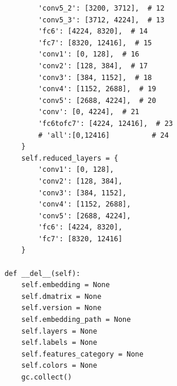 \documentclass[12,twoside]{TFG-GM}
\theoremstyle{definition}
\theoremstyle{remark}
\begin{document}
\begin{verbatim}
            'conv5_2': [3200, 3712],  # 12
            'conv5_3': [3712, 4224],  # 13
            'fc6': [4224, 8320],  # 14
            'fc7': [8320, 12416],  # 15
            'conv1': [0, 128],  # 16
            'conv2': [128, 384],  # 17
            'conv3': [384, 1152],  # 18
            'conv4': [1152, 2688],  # 19
            'conv5': [2688, 4224],  # 20
            'conv': [0, 4224],  # 21
            'fc6tofc7': [4224, 12416],  # 23
            # 'all':[0,12416]          # 24
        }
        self.reduced_layers = {
            'conv1': [0, 128],
            'conv2': [128, 384],
            'conv3': [384, 1152],
            'conv4': [1152, 2688],
            'conv5': [2688, 4224],
            'fc6': [4224, 8320],
            'fc7': [8320, 12416]
        }

    def __del__(self):
        self.embedding = None
        self.dmatrix = None
        self.version = None
        self.embedding_path = None
        self.layers = None
        self.labels = None
        self.features_category = None
        self.colors = None
        gc.collect()


\end{verbatim}
\end{document}
